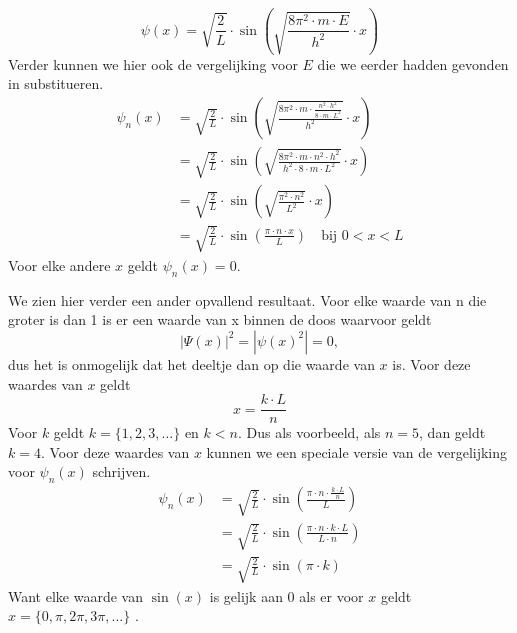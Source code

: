 \documentclass[11pt,fleqn]{book} %
\begin{document}
\begin{displaymath}
\psi(x)=\sqrt{\frac{2}{L}}\cdot\sin{\left(\sqrt{\frac{8\pi^2\cdot m\cdot E}{h^2}}\cdot x\right)}
\end{displaymath}
Verder kunnen we hier ook de vergelijking voor $E$ die we eerder hadden gevonden in substitueren.
\begin{align*}
\psi_n(x) &=\sqrt{\frac{2}{L}}\cdot\sin{\left(\sqrt{\frac{8\pi^2\cdot m\cdot \frac{n^2\cdot h^2}{8\cdot m\cdot L^2}}{h^2}}\cdot x\right)}\\
&= \sqrt{\frac{2}{L}}\cdot\sin{\left(\sqrt{\frac{8\pi^2\cdot m\cdot n^2\cdot h^2}{h^2\cdot 8\cdot m\cdot L^2}}\cdot x\right)}\\
&= \sqrt{\frac{2}{L}}\cdot\sin{\left(\sqrt{\frac{\pi^2\cdot n^2}{L^2}}\cdot x\right)}\\
&= \sqrt{\frac{2}{L}}\cdot\sin{\left(\frac{\pi\cdot n\cdot x}{L}\right)}\quad \text{bij } 0<x<L
\end{align*}
Voor elke andere $x$ geldt $\psi_n(x)=0$.

We zien hier verder een ander opvallend resultaat. Voor elke waarde van n die groter is dan 1 is er een waarde van x binnen de doos waarvoor geldt
\begin{displaymath}
{\left|\Psi(x)\right|}^2=\left|{\psi(x)}^2\right|=0,
\end{displaymath}
dus het is onmogelijk dat het deeltje dan op die waarde van $x$ is. Voor deze waardes van $x$ geldt
\begin{displaymath}
x=\frac{k\cdot L}{n}
\end{displaymath}
Voor $k$ geldt $k=\{1, 2, 3, \ldots\}$ en $k<n$. Dus als voorbeeld, als $n=5$, dan geldt $k=4$. Voor deze waardes van $x$ kunnen we een speciale versie van de vergelijking voor $\psi_n(x)$ schrijven.
\begin{align*}
\psi_n(x) &= \sqrt{\frac{2}{L}}\cdot\sin{\left(\frac{\pi\cdot n\cdot \frac{k\cdot L}{n}}{L}\right)}\\
&= \sqrt{\frac{2}{L}}\cdot\sin{\left(\frac{\pi\cdot n\cdot k\cdot L}{L\cdot n}\right)}\\
&= \sqrt{\frac{2}{L}}\cdot\sin{\left(\pi\cdot k\right)}
\end{align*}
Want elke waarde van $\sin{(x)}$ is gelijk aan 0 als er voor $x$ geldt $x=\{0, \pi, 2\pi, 3\pi, \ldots\}$ \cite{inaction}.
\end{document}
